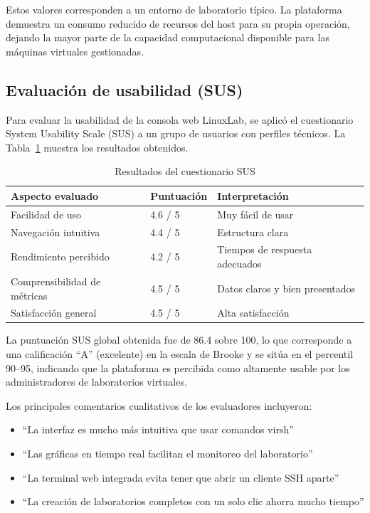 Estos valores corresponden a un entorno de laboratorio típico. La plataforma
demuestra un consumo reducido de recursos del host para su propia operación,
dejando la mayor parte de la capacidad computacional disponible para las máquinas
virtuales gestionadas.

\subsection{Evaluación de usabilidad (SUS)}

Para evaluar la usabilidad de la consola web LinuxLab, se aplicó el cuestionario
System Usability Scale (SUS) \cite{brooke1996sus} a un grupo de usuarios con
perfiles técnicos. La Tabla~\ref{tab:sus_results} muestra los resultados
obtenidos.

\begin{table}[htbp]
\caption{Resultados del cuestionario SUS}
\label{tab:sus_results}
\centering
\footnotesize
\begin{tabular}{p{4cm} p{2cm} p{3cm}}
\toprule
\textbf{Aspecto evaluado} & \textbf{Puntuación} & \textbf{Interpretación} \\
\midrule
Facilidad de uso & 4.6 / 5 & Muy fácil de usar \\
Navegación intuitiva & 4.4 / 5 & Estructura clara \\
Rendimiento percibido & 4.2 / 5 & Tiempos de respuesta adecuados \\
Comprensibilidad de métricas & 4.5 / 5 & Datos claros y bien presentados \\
Satisfacción general & 4.5 / 5 & Alta satisfacción \\
\bottomrule
\end{tabular}
\end{table}

La puntuación SUS global obtenida fue de 86.4 sobre 100, lo que corresponde a una
calificación ``A'' (excelente) en la escala de Brooke \cite{brooke1996sus} y
se sitúa en el percentil 90--95, indicando que la plataforma es percibida como
altamente usable por los administradores de laboratorios virtuales.

Los principales comentarios cualitativos de los evaluadores incluyeron:
\begin{itemize}
    \item ``La interfaz es mucho más intuitiva que usar comandos virsh''
    \item ``Las gráficas en tiempo real facilitan el monitoreo del laboratorio''
    \item ``La terminal web integrada evita tener que abrir un cliente SSH aparte''
    \item ``La creación de laboratorios completos con un solo clic ahorra mucho tiempo''
\end{itemize}


